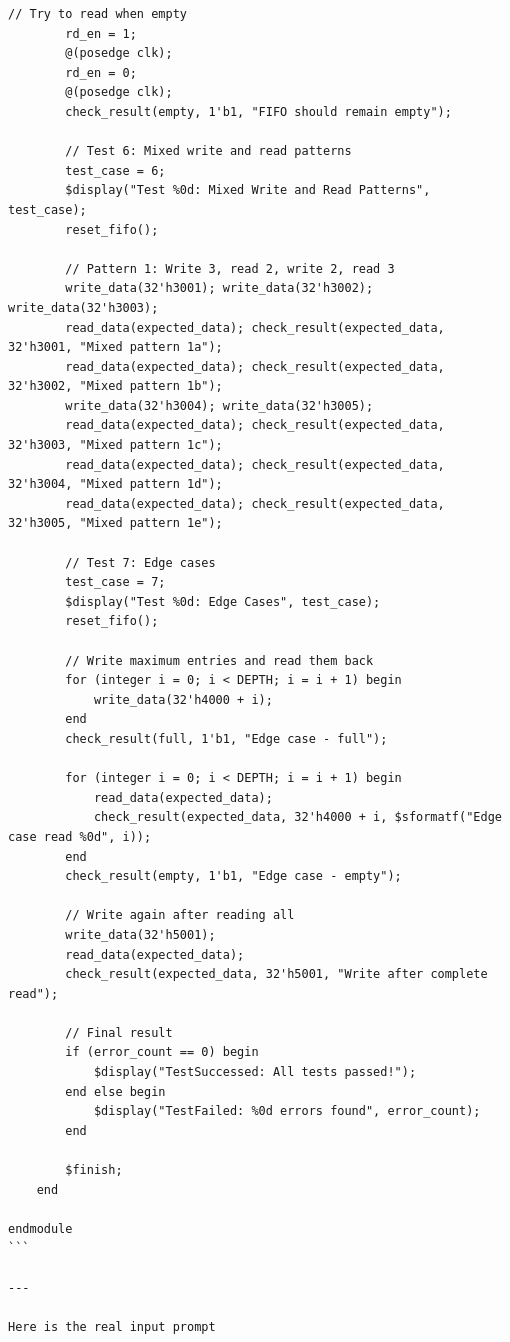 \documentclass[UTF8]{ctexart}
\begin{document}
\begin{lstlisting}[frame=shadowbox]
        // Try to read when empty
        rd_en = 1;
        @(posedge clk);
        rd_en = 0;
        @(posedge clk);
        check_result(empty, 1'b1, "FIFO should remain empty");
        
        // Test 6: Mixed write and read patterns
        test_case = 6;
        $display("Test %0d: Mixed Write and Read Patterns", test_case);
        reset_fifo();
        
        // Pattern 1: Write 3, read 2, write 2, read 3
        write_data(32'h3001); write_data(32'h3002); write_data(32'h3003);
        read_data(expected_data); check_result(expected_data, 32'h3001, "Mixed pattern 1a");
        read_data(expected_data); check_result(expected_data, 32'h3002, "Mixed pattern 1b");
        write_data(32'h3004); write_data(32'h3005);
        read_data(expected_data); check_result(expected_data, 32'h3003, "Mixed pattern 1c");
        read_data(expected_data); check_result(expected_data, 32'h3004, "Mixed pattern 1d");
        read_data(expected_data); check_result(expected_data, 32'h3005, "Mixed pattern 1e");
        
        // Test 7: Edge cases
        test_case = 7;
        $display("Test %0d: Edge Cases", test_case);
        reset_fifo();
        
        // Write maximum entries and read them back
        for (integer i = 0; i < DEPTH; i = i + 1) begin
            write_data(32'h4000 + i);
        end
        check_result(full, 1'b1, "Edge case - full");
        
        for (integer i = 0; i < DEPTH; i = i + 1) begin
            read_data(expected_data);
            check_result(expected_data, 32'h4000 + i, $sformatf("Edge case read %0d", i));
        end
        check_result(empty, 1'b1, "Edge case - empty");
        
        // Write again after reading all
        write_data(32'h5001);
        read_data(expected_data);
        check_result(expected_data, 32'h5001, "Write after complete read");
        
        // Final result
        if (error_count == 0) begin
            $display("TestSuccessed: All tests passed!");
        end else begin
            $display("TestFailed: %0d errors found", error_count);
        end
        
        $finish;
    end

endmodule
```

---

Here is the real input prompt


\end{lstlisting}
\end{document}
